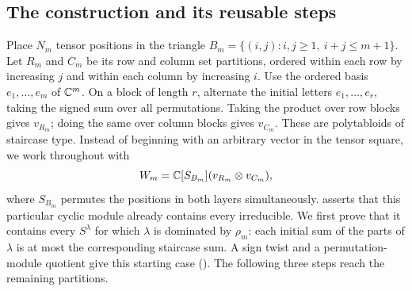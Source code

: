 \subsection{The construction and its reusable steps}

Place $N_m$ tensor positions in the triangle
$B_m=\{(i,j):i,j\ge1,\ i+j\le m+1\}$.
Let $R_m$ and $C_m$ be its row and column set partitions, ordered within
each row by increasing $j$ and within each column by increasing $i$.
Use the ordered basis $e_1,\ldots,e_m$ of $\mathbb C^m$. On a block of length
$r$, alternate the initial letters $e_1,\ldots,e_r$, taking the signed
sum over all permutations. Taking the product over row blocks gives
$v_{R_m}$; doing the same over column blocks gives $v_{C_m}$.
These are polytabloids of staircase type. Instead of beginning with an
arbitrary vector in the tensor square, we work throughout with
\[
W_m=\mathbb C[S_{B_m}](v_{R_m}\otimes v_{C_m}),
\]
where $S_{B_m}$ permutes the positions in both layers simultaneously.
 asserts that this particular cyclic module already
contains every irreducible. We first prove that it contains every
$S^\lambda$ for which $\lambda$ is dominated by $\rho_m$: each initial
sum of the parts of $\lambda$ is at most the corresponding staircase
sum. A sign twist and a permutation-module quotient give this starting
case (). The following three steps reach the
remaining partitions.

